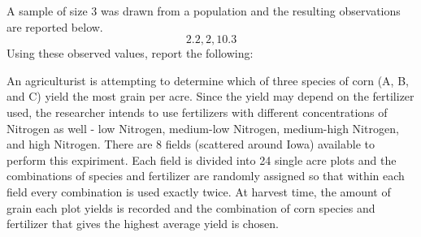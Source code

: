 \documentclass[addpoints]{examsetup}\usepackage[]{graphicx}\usepackage[]{color}
\begin{document}
\begin{questions}
\question 

A sample of size 3 was drawn from a population and the resulting observations are reported below. 
$$
   2.2, 2, 10.3
$$
Using these observed values, report the following:

\vspace{1cm}


\newpage

\question
An agriculturist is attempting to determine which of three species of corn (A, B, and C) yield the most grain per acre.
Since the yield may depend on the fertilizer used, the researcher intends to use fertilizers with different concentrations of Nitrogen as well - low Nitrogen, medium-low Nitrogen, medium-high Nitrogen, and high Nitrogen.
There are 8 fields (scattered around Iowa) available to perform this expiriment. 
Each field is divided into 24 single acre plots and the combinations of species and fertilizer are randomly assigned so that within each field every combination is used exactly twice.
At harvest time, the amount of grain each plot yields is recorded and the combination of corn species and fertilizer that gives the highest average yield is chosen.


\end{questions}
\end{document}
